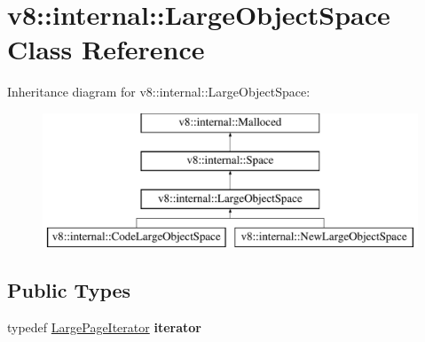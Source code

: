 \hypertarget{classv8_1_1internal_1_1LargeObjectSpace}{}\section{v8\+:\+:internal\+:\+:Large\+Object\+Space Class Reference}
\label{classv8_1_1internal_1_1LargeObjectSpace}
Inheritance diagram for v8\+:\+:internal\+:\+:Large\+Object\+Space\+:\begin{figure}[H]
\begin{center}
\leavevmode
\includegraphics[height=4.000000cm]{classv8_1_1internal_1_1LargeObjectSpace}
\end{center}
\end{figure}
\subsection*{Public Types}
\begin{DoxyCompactItemize}
\item 
\mbox{\label{classv8_1_1internal_1_1LargeObjectSpace_a89020b6f4142f9bd256169940eaa9229}} 
typedef \mbox{\hyperlink{classv8_1_1internal_1_1PageIteratorImpl}{Large\+Page\+Iterator}} {\bfseries iterator}
\end{DoxyCompactItemize}
